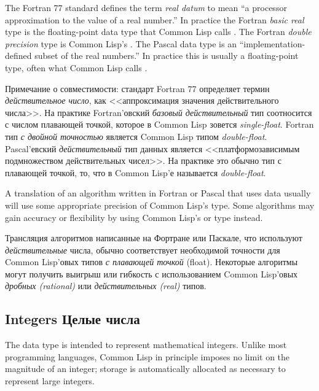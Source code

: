 \begin{newer}
\beforenoterule
\begin{incompatibility}
The Fortran 77 standard defines the term
             \emph{real datum} to mean ``a processor approximation to the value
             of a real number.''  In practice the Fortran \emph{basic real} type
             is the floating-point data type that Common Lisp calls
             .  The Fortran \emph{double precision} type is
             Common Lisp's .  The Pascal  data type is
             an ``implementation-defined subset of the real numbers.''  In
             practice this is usually a floating-point type, often what
             Common Lisp calls .

Примечание о совместимости: стандарт Fortran 77 определяет термин
\emph{действительное число}, как <<аппроксимация значения действительного
числа>>. На практике Fortran'овский \emph{базовый действительный} тип
соотносится с числом плавающей точкой, которое в Common Lisp
зовется \emph{single-float}. Fortran тип \emph{с двойной точностью} является
Common Lisp типом \emph{double-float}. Pascal'евский \emph{действительный} тип
данных является <<платформозависимым подмножеством действительных
чисел>>. На практике это обычно тип с плавающей точкой, то, что в
Common Lisp'е называется \emph{double-float}. 

             A translation of an algorithm written in Fortran or Pascal
             that uses  data usually will use some appropriate
             precision of Common Lisp's  type.  Some algorithms may
             gain accuracy or flexibility by using Common Lisp's
              or  type instead.

Трансляция алгоритмов написанные на Фортране или Паскале, что
используют \emph{действительные} числа, обычно соответствует необходимой
точности для Common Lisp'овых типов \emph{с плавающей точкой}
(float). Некоторые алгоритмы могут получить выигрыш или гибкость с
использованием Common Lisp'овых \emph{дробных (rational)} или
\emph{действительных (real)} типов. 
\end{incompatibility}
\afternoterule
\end{newer}

\subsection{Integers Целые числа}
\label{INTEGERS-SECTION}

The  data type is intended to represent mathematical integers.
Unlike most programming languages, Common Lisp in principle imposes no limit on
the magnitude of an integer; storage
is automatically allocated as necessary to represent large integers.

